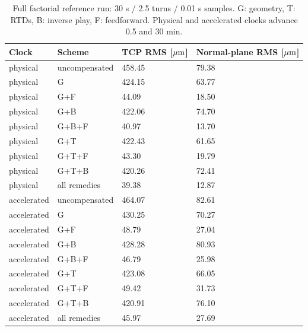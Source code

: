 \begin{table}[H]\centering\small
\begin{tabular}{llll}\toprule
Clock & Scheme & TCP RMS [$\mu\mathrm{m}$] & Normal-plane RMS [$\mu\mathrm{m}$]\\\midrule
physical & uncompensated & 458.45 & 79.38\\
physical & G & 424.15 & 63.77\\
physical & G+F & 44.09 & 18.50\\
physical & G+B & 422.06 & 74.70\\
physical & G+B+F & 40.97 & 13.70\\
physical & G+T & 422.43 & 61.65\\
physical & G+T+F & 43.30 & 19.79\\
physical & G+T+B & 420.26 & 72.41\\
physical & all remedies & 39.38 & 12.87\\
accelerated & uncompensated & 464.07 & 82.61\\
accelerated & G & 430.25 & 70.27\\
accelerated & G+F & 48.79 & 27.04\\
accelerated & G+B & 428.28 & 80.93\\
accelerated & G+B+F & 46.79 & 25.98\\
accelerated & G+T & 423.08 & 66.05\\
accelerated & G+T+F & 49.42 & 31.73\\
accelerated & G+T+B & 420.91 & 76.10\\
accelerated & all remedies & 45.97 & 27.69\\
\bottomrule\end{tabular}\caption{Full factorial reference run: 30 s / 2.5 turns / 0.01 s samples. G: geometry, T: RTDs, B: inverse play, F: feedforward. Physical and accelerated clocks advance 0.5 and 30 min.}\label{tab:publication_dynamic_table}\end{table}
